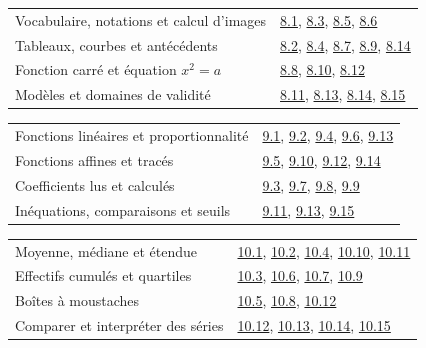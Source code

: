 \begin{tabularx}{\linewidth}{@{}Yl@{}}\toprule
Vocabulaire, notations et calcul d’images & \hyperref[exo-8-1]{8.1}, \hyperref[exo-8-3]{8.3}, \hyperref[exo-8-5]{8.5}, \hyperref[exo-8-6]{8.6}\\[2mm]
Tableaux, courbes et antécédents & \hyperref[exo-8-2]{8.2}, \hyperref[exo-8-4]{8.4}, \hyperref[exo-8-7]{8.7}, \hyperref[exo-8-9]{8.9}, \hyperref[exo-8-14]{8.14}\\[2mm]
Fonction carré et équation $x^2=a$ & \hyperref[exo-8-8]{8.8}, \hyperref[exo-8-10]{8.10}, \hyperref[exo-8-12]{8.12}\\[2mm]
Modèles et domaines de validité & \hyperref[exo-8-11]{8.11}, \hyperref[exo-8-13]{8.13}, \hyperref[exo-8-14]{8.14}, \hyperref[exo-8-15]{8.15}\\[2mm]
\bottomrule\end{tabularx}\par\vspace{4mm}
\begin{tabularx}{\linewidth}{@{}Yl@{}}\toprule
Fonctions linéaires et proportionnalité & \hyperref[exo-9-1]{9.1}, \hyperref[exo-9-2]{9.2}, \hyperref[exo-9-4]{9.4}, \hyperref[exo-9-6]{9.6}, \hyperref[exo-9-13]{9.13}\\[2mm]
Fonctions affines et tracés & \hyperref[exo-9-5]{9.5}, \hyperref[exo-9-10]{9.10}, \hyperref[exo-9-12]{9.12}, \hyperref[exo-9-14]{9.14}\\[2mm]
Coefficients lus et calculés & \hyperref[exo-9-3]{9.3}, \hyperref[exo-9-7]{9.7}, \hyperref[exo-9-8]{9.8}, \hyperref[exo-9-9]{9.9}\\[2mm]
Inéquations, comparaisons et seuils & \hyperref[exo-9-11]{9.11}, \hyperref[exo-9-13]{9.13}, \hyperref[exo-9-15]{9.15}\\[2mm]
\bottomrule\end{tabularx}\par\vspace{4mm}
\clearpage
{}\fontsize{10}{13}\selectfont
{}\begin{tabularx}{\linewidth}{@{}Yl@{}}\toprule
Moyenne, médiane et étendue & \hyperref[exo-10-1]{10.1}, \hyperref[exo-10-2]{10.2}, \hyperref[exo-10-4]{10.4}, \hyperref[exo-10-10]{10.10}, \hyperref[exo-10-11]{10.11}\\[2mm]
Effectifs cumulés et quartiles & \hyperref[exo-10-3]{10.3}, \hyperref[exo-10-6]{10.6}, \hyperref[exo-10-7]{10.7}, \hyperref[exo-10-9]{10.9}\\[2mm]
Boîtes à moustaches & \hyperref[exo-10-5]{10.5}, \hyperref[exo-10-8]{10.8}, \hyperref[exo-10-12]{10.12}\\[2mm]
Comparer et interpréter des séries & \hyperref[exo-10-12]{10.12}, \hyperref[exo-10-13]{10.13}, \hyperref[exo-10-14]{10.14}, \hyperref[exo-10-15]{10.15}\\[2mm]
\bottomrule\end{tabularx}\par\vspace{4mm}
